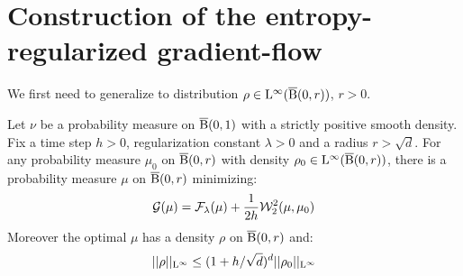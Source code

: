 
\section{Construction of the entropy-regularized gradient-flow}

We first need to generalize \cite[Lemma 5.4.3]{bonnotte2013unidimensional} to distribution $\rho \in \mathrm{L}^{\infty}(\operatorname{\overline{B}}(0,r))$, $r >0$.
\begin{thm} \label{thm:implicit_step}
 Let $\nu$ be a probability measure on $\operatorname{\overline{B}}(0,1)$ with a strictly positive smooth density. Fix a time step $h > 0$, regularization constant $\lambda > 0$ and a radius $r > \sqrt{d}$. For any probability measure $\mu_0$ on $\operatorname{\overline{B}}(0, r)$ with density $\rho_0 \in \mathrm{L}^{\infty}(\operatorname{\overline{B}}(0, r))$, there is a probability measure $\mu$ on $\operatorname{\overline{B}}(0,r)$ minimizing:
\[
\mathcal{G}(\mu) = \mathcal{F}_{\lambda} (\mu) + \frac{1}{2h} {\cal W}_2^2(\mu, \mu_0) 
\]
Moreover the optimal $\mu$ has a density $\rho$ on $\operatorname{\overline{B}}(0,r)$ and:
\begin{equation} \label{ineq:inf_norm_bound}
||\rho||_{\mathrm{L}^{\infty}} \leq (1 + h/\sqrt{d})^d ||\rho_0||_{\mathrm{L}^{\infty}}
\end{equation}
\end{thm}

